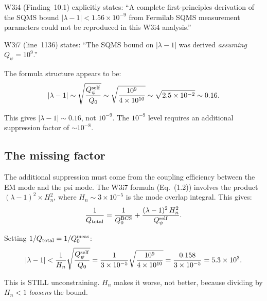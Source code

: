 \documentclass[11pt]{article}
\newcommand{\lam}{\lambda}
\newcommand{\lbone}{|\lambda - 1|}
\newcommand{\Qpsi}{Q_\psi}
\newcommand{\ee}[1]{\times 10^{#1}}
\theoremstyle{definition}
\theoremstyle{remark}
\begin{document}
W3i4 (Finding~10.1) explicitly states: ``A complete first-principles
derivation of the SQMS bound $|\lam-1| < 1.56\ee{-9}$ from Fermilab
SQMS measurement parameters could not be reproduced in this W3i4
analysis.''

W3i7 (line~1136) states: ``The SQMS bound on $\lbone$ was derived
\emph{assuming} $\Qpsi = 10^9$.''

The formula structure appears to be:
\begin{equation}
\lbone \sim \sqrt{\frac{\Qpsi^{\rm self}}{Q_0}}
\sim \sqrt{\frac{10^9}{4\ee{10}}} \sim \sqrt{2.5\ee{-2}} \sim 0.16.
\label{eq:naive_bound}
\end{equation}

This gives $\lbone \sim 0.16$, not $10^{-9}$. The $10^{-9}$ level
requires an additional suppression factor of $\sim 10^{-8}$.

\subsection{The missing factor}

The additional suppression must come from the coupling efficiency
between the EM mode and the psi mode. The W3i7 formula
(Eq.~(1.2)) involves the product $(\lam-1)^2 \times H_n^2$, where
$H_n \sim 3\ee{-5}$ is the mode overlap integral. This gives:
\begin{equation}
\frac{1}{Q_{\rm total}} = \frac{1}{Q_0^{\rm BCS}} +
\frac{(\lam-1)^2\,H_n^2}{\Qpsi^{\rm self}}.
\end{equation}

Setting $1/Q_{\rm total} = 1/Q_0^{\rm meas}$:
\begin{equation}
\lbone < \frac{1}{H_n}\sqrt{\frac{\Qpsi^{\rm self}}{Q_0}}
= \frac{1}{3\ee{-5}}\sqrt{\frac{10^9}{4\ee{10}}}
= \frac{0.158}{3\ee{-5}} = 5.3\ee{3}.
\label{eq:with_Hn}
\end{equation}

This is STILL unconstraining. $H_n$ makes it worse, not better,
because dividing by $H_n < 1$ \emph{loosens} the bound.
\end{document}
